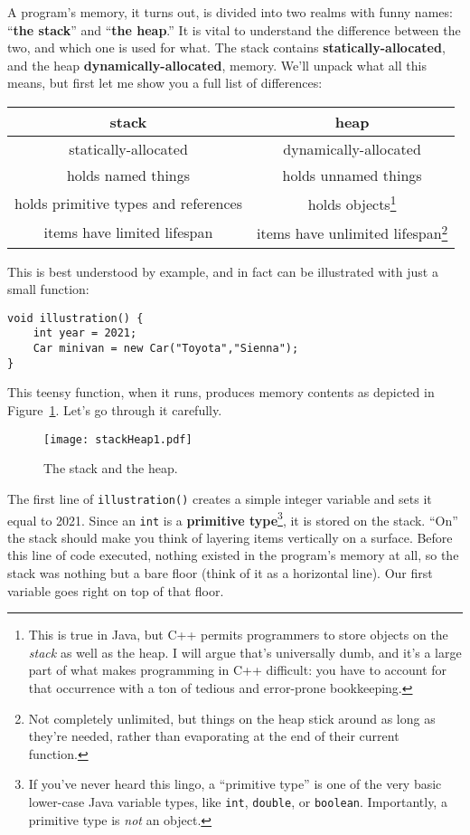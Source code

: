 A program's memory, it turns out, is divided into two realms with funny names:
``\textbf{the stack}'' and ``\textbf{the heap}.'' It is vital to understand the
difference between the two, and which one is used for what. The stack contains
\textbf{statically-allocated}, and the heap \textbf{dynamically-allocated},
memory. We'll unpack what all this means, but first let me show you a full list
of differences:

\small
\vspace{.2in}
\begin{tabular}{c|c}
\textbf{stack} & \textbf{heap} \\
\hline
statically-allocated & dynamically-allocated \\
\index{names}
holds named things & holds unnamed things \\
holds primitive types and references & holds objects\footnote{This is
true in Java, but C++ permits programmers to store objects on the
\textit{stack} as well as the heap. I will argue that's universally dumb, and
it's a large part of what makes programming in C++ difficult: you have to
account for that occurrence with a ton of tedious and error-prone
bookkeeping.} \\
\index{lifespan}
items have limited lifespan & items have unlimited lifespan\footnote{Not
completely unlimited, but things on the heap stick around as long as they're
needed, rather than evaporating at the end of their current function.} \\
\end{tabular}
\vspace{.2in}
\normalsize

This is best understood by example, and in fact can be illustrated with just a
small function:

\begin{Verbatim}[fontsize=\small,samepage=true,frame=single]
void illustration() {
    int year = 2021;
    Car minivan = new Car("Toyota","Sienna");
}
\end{Verbatim}

This teensy function, when it runs, produces memory contents as depicted in
Figure~\ref{fig:stackHeap1}. Let's go through it carefully.

\begin{figure}[ht]   %
\centering
\texttt{[image: stackHeap1.pdf]}
\caption{The stack and the heap.}
\label{fig:stackHeap1}
\end{figure}

The first line of \texttt{illustration()} creates a simple integer variable
and sets it equal to 2021. Since an \texttt{int} is a \textbf{primitive
type}\footnote{If you've never heard this lingo, a ``primitive type'' is one of
the very basic lower-case Java variable types, like \texttt{int},
\texttt{double}, or \texttt{boolean}. Importantly, a primitive type is
\textit{not} an object.}, it is stored on the stack. ``On'' the stack should
make you think of layering items vertically on a surface. Before this line of
code executed, nothing existed in the program's memory at all, so the stack
was nothing but a bare floor (think of it as a horizontal line). Our first
variable goes right on top of that floor.

